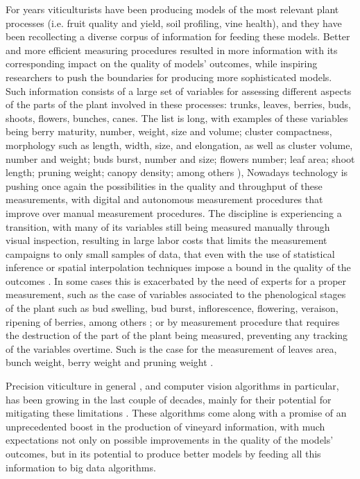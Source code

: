 \documentclass[a4paper,authoryear,review]{elsarticle}
\begin{document}
%
For years viticulturists have been producing models of the most relevant plant processes (i.e. fruit quality and yield, soil profiling, vine health), and they have been recollecting a diverse corpus of information for feeding these models. Better and more efficient measuring procedures resulted in more information with its corresponding impact on the quality of models’ outcomes, while inspiring researchers to push the boundaries for producing more sophisticated models. Such information consists of a large set of variables for assessing different aspects of the parts of the plant involved in these processes: trunks, leaves, berries, buds, shoots, flowers, bunches, canes. The list is long, with examples of these variables being berry maturity, number, weight, size and volume; cluster compactness, morphology such as length, width, size, and elongation, as well as cluster volume, number and weight; buds burst, number and size; flowers number; leaf area; shoot length; pruning weight; canopy density; among others \citep{awriNDmanual1, awriNDmanual3}),
%
Nowadays technology is pushing once again the possibilities in the quality and throughput of these measurements, with digital and autonomous measurement procedures that improve over manual measurement procedures. The discipline is experiencing a transition, with many of its variables still being measured manually through visual inspection, resulting in large labor costs that limits the measurement campaigns to only small samples of data, that even with the use of statistical inference or spatial interpolation techniques impose a bound in the quality of the outcomes \citep{whelan1996spatial}. 
%
In some cases this is exacerbated by the need of experts for a proper measurement, such as the case of variables associated to the phenological stages of the plant such as bud swelling, bud burst, inflorescence, flowering, veraison, ripening of berries, among others \citep{lorenz1995growth}; or by measurement procedure that requires the destruction of the part of the plant being measured, preventing any tracking of the variables overtime. Such is the case for the measurement of leaves area, bunch weight, berry weight and pruning weight \citep{kliewer2005leaf}. 

%
Precision viticulture in general \citep{bramley2009lessons}, and computer vision algorithms in particular, has been growing in the last couple of decades, mainly for their potential for mitigating these limitations \citep{seng2018computer, matese2015technology}. These algorithms come along with a promise of an unprecedented boost in the production of vineyard information, with much expectations not only on possible improvements in the quality of the models’ outcomes, but in its potential to produce better models by feeding all this information to big data algorithms. 
\end{document}
